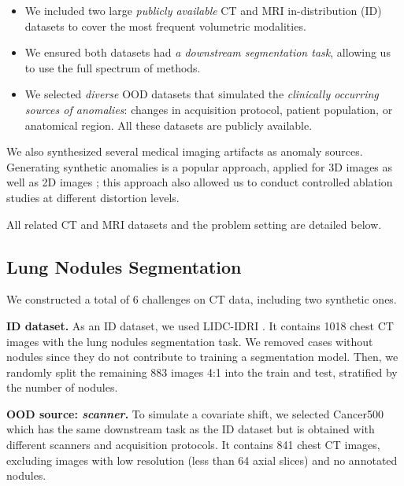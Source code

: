 \begin{itemize}
	
	\item We included two large \textit{publicly available} CT and MRI in-distribution (ID) datasets to cover the most frequent volumetric modalities.
	
	\item We ensured both datasets had \textit{a downstream segmentation task}, allowing us to use the full spectrum of methods.
	
	\item We selected \textit{diverse} OOD datasets that simulated the \textit{clinically occurring sources of anomalies}: changes in acquisition protocol, patient population, or anatomical region. All these datasets are publicly available.
	
\end{itemize}

We also synthesized several medical imaging artifacts as anomaly sources. Generating synthetic anomalies is a popular approach, applied for 3D images \cite{david_zimmerer_2022_6362313,lambert2022improving} as well as 2D images \cite{hendrycks2016baseline,basart2022scaling}; this approach also allowed us to conduct controlled ablation studies at different distortion levels.

All related CT and MRI datasets and the problem setting are detailed below.


\subsection{Lung Nodules Segmentation}

We constructed a total of 6 challenges on CT data, including two synthetic ones.

\textbf{ID dataset.} As an ID dataset, we used LIDC-IDRI \cite{lidc}. It contains 1018 chest CT images with the lung nodules segmentation task. We removed cases without nodules since they do not contribute to training a segmentation model. Then, we randomly split the remaining 883 images 4:1 into the train and test, stratified by the number of nodules.

\textbf{OOD source: \textit{scanner}.} To simulate a covariate shift, we selected Cancer500 \cite{morozov2021simplified} which has the same downstream task as the ID dataset but is obtained with different scanners and acquisition protocols. It contains 841 chest CT images, excluding images with low resolution (less than 64 axial slices) and no annotated nodules.

